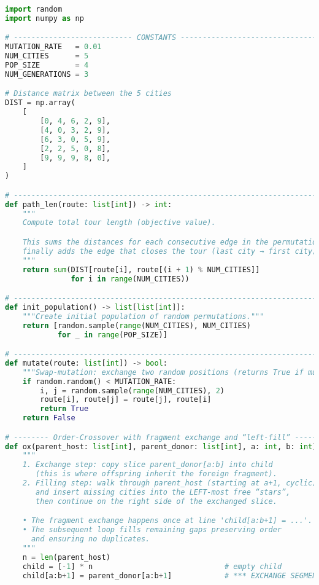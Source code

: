 \documentclass[a4paper,12pt]{article}
\begin{document}
\begin{lstlisting}[language=Python]
import random
import numpy as np

# --------------------------- CONSTANTS ---------------------------------------
MUTATION_RATE   = 0.01
NUM_CITIES      = 5
POP_SIZE        = 4
NUM_GENERATIONS = 3

# Distance matrix between the 5 cities
DIST = np.array(
    [
        [0, 4, 6, 2, 9],
        [4, 0, 3, 2, 9],
        [6, 3, 0, 5, 9],
        [2, 2, 5, 0, 8],
        [9, 9, 9, 8, 0],
    ]
)

# --------------------------------------------------------------------------- #
def path_len(route: list[int]) -> int:
    """
    Compute total tour length (objective value).

    This sums the distances for each consecutive edge in the permutation and
    finally adds the edge that closes the tour (last city → first city).
    """
    return sum(DIST[route[i], route[(i + 1) % NUM_CITIES]]
               for i in range(NUM_CITIES))

# --------------------------------------------------------------------------- #
def init_population() -> list[list[int]]:
    """Create initial population of random permutations."""
    return [random.sample(range(NUM_CITIES), NUM_CITIES)
            for _ in range(POP_SIZE)]

# --------------------------------------------------------------------------- #
def mutate(route: list[int]) -> bool:
    """Swap-mutation: exchange two random positions (returns True if mutated)."""
    if random.random() < MUTATION_RATE:
        i, j = random.sample(range(NUM_CITIES), 2)
        route[i], route[j] = route[j], route[i]
        return True
    return False

# -------- Order-Crossover with fragment exchange and “left-fill” ------------ #
def ox(parent_host: list[int], parent_donor: list[int], a: int, b: int) -> list[int]:
    """
    1. Exchange step: copy slice parent_donor[a:b] into child
       (this is where offspring inherit the foreign fragment).
    2. Filling step: walk through parent_host (starting at a+1, cyclic)
       and insert missing cities into the LEFT-most free “stars”,
       then continue on the right side of the exchanged slice.

    • The fragment exchange happens once at line 'child[a:b+1] = ...'.
    • The subsequent loop fills remaining gaps preserving order
      and ensuring no duplicates.
    """
    n = len(parent_host)
    child = [-1] * n                              # empty child
    child[a:b+1] = parent_donor[a:b+1]            # *** EXCHANGE SEGMENT ***


\end{lstlisting}
\end{document}
